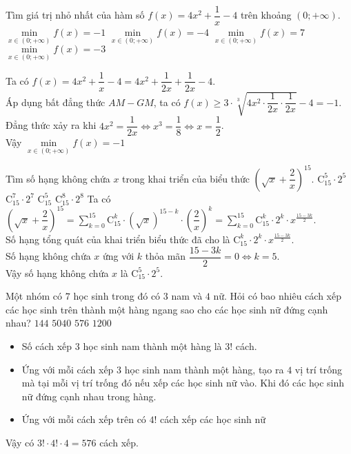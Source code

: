 \begin{ex}%
	Tìm giá trị nhỏ nhất của hàm số  $f(x)= 4x^2+\dfrac{1}{x}-4$ trên khoảng $(0;+\infty)$.
		\choice
	{\True $\min\limits_{x\in (0;+\infty)} f(x) =-1$}
	{$\min\limits_{x\in (0;+\infty)} f(x) =-4$}
	{$\min\limits_{x\in (0;+\infty)} f(x) =7$}
	{$\min\limits_{x\in (0;+\infty)} f(x) =-3$}
	\loigiai
	{ Ta có $f(x)=4x^2+\dfrac{1}{x}-4 =4x^2+\dfrac{1}{2x}+\dfrac{1}{2x} -4.$\\
		Áp dụng bất đẳng thức $AM-GM$, ta có $f(x) \geq 3\cdot \sqrt[3]{4x^2 \cdot \dfrac{1}{2x}\cdot \dfrac{1}{2x}} -4 =-1$.
		Đẳng thức xảy ra khi $4x^2=\dfrac{1}{2x} \Leftrightarrow x^3=\dfrac{1}{8} \Leftrightarrow x=\dfrac{1}{2}$.\\
		Vậy $\min\limits_{x\in (0;+\infty)} f(x) =-1$
		
	}
\end{ex}

\begin{ex}%
	Tìm số hạng không chứa $x$ trong khai triển của biểu thức $\left( \sqrt{x}+\dfrac{2}{x}\right)^{15}$.
		\choice
	{\True $\mathrm{C}_{15}^5 \cdot 2^5$}
	{$\mathrm{C}_{15}^7 \cdot 2^7$}
	{$\mathrm{C}_{15}^5$}
	{$\mathrm{C}_{15}^8 \cdot 2^8$}
	\loigiai
	{ Ta có $\left( \sqrt{x}+\dfrac{2}{x}\right)^{15}= \sum\limits_{k=0}^{15}\mathrm{C}_{15}^k\cdot (\sqrt{x})^{15-k}\cdot \left( \dfrac{2}{x}\right)^{k}=\sum\limits_{k=0}^{15}\mathrm{C}_{15}^k\cdot 2^k \cdot x^{\frac{15-3k}{2}}$.\\
		Số hạng tổng quát của khai triển biểu thức đã cho là $\mathrm{C}_{15}^k\cdot 2^k \cdot x^{\frac{15-3k}{2}}$.\\
		Số hạng không chứa $x$ ứng với $k$ thỏa mãn $\dfrac{15-3k}{2}=0 \Leftrightarrow k=5$.\\
		Vậy số hạng không chứa $x$ là  $\mathrm{C}_{15}^5 \cdot 2^5$.
	}
\end{ex}

\begin{ex}%
	Một nhóm có $7$ học sinh trong đó có $3$ nam và $4$ nữ. Hỏi có bao nhiêu cách xếp các học sinh trên thành một hàng ngang sao cho các học sinh nữ đứng cạnh nhau?
		\choice
	{$144$}
	{$5040$}
	{\True $576$}
	{$1200$}
	\loigiai
	{ \begin{itemize}
			\item Số cách xếp $3$ học sinh nam thành một hàng là $3!$ cách.
			\item Ứng với mỗi cách xếp $3$ học sinh nam thành một hàng, tạo ra $4$ vị trí trống mà tại mỗi vị trí trống đó nếu xếp các học sinh nữ vào. Khi đó các học sinh nữ đứng cạnh nhau trong hàng.
			\item Ứng với mỗi cách xếp trên có $4!$ cách xếp các học sinh nữ 
		\end{itemize}
		Vậy có $3!\cdot 4!\cdot 4 =576$ cách xếp.
	}
\end{ex}


